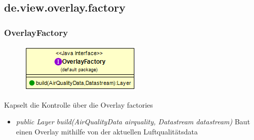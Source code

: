 \subsection{de.view.overlay.factory}

\subsubsection{OverlayFactory}
\begin{minipage}{0.3\textwidth}
    \begin{figure}[H]
        \includegraphics[scale = 0.5
        ]{media/view/factory/OverlayFactory_Class.png}
    \end{figure}
    \end{minipage} \hfill
    \begin{minipage}{0.6\textwidth}
Kapselt die Kontrolle über die Overlay factories
\end{minipage}
\begin{itemize} [noitemsep]
    \item \emph{public Layer build(AirQualityData airquality,  Datastream datastream)}  Baut einen Overlay mithilfe von der aktuellen Luftqualitätsdata
\end{itemize}

